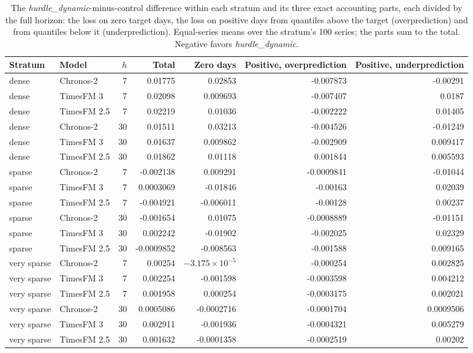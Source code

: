 \begin{table}[htbp]
\centering\footnotesize\setlength{\tabcolsep}{3.5pt}
\caption{The \emph{hurdle\_dynamic}-minus-control \qs{} difference within each stratum and its three exact
accounting parts, each divided by the full horizon: the loss on zero target days, the loss on positive days
from quantiles above the target (overprediction) and from quantiles below it (underprediction). Equal-series
means over the stratum's 100 series; the parts sum to the total. Negative favors \emph{hurdle\_dynamic}.}
\label{tab:s3parts}
\begin{tabular}{llrrrrr}
\toprule
Stratum & Model & $h$ & Total & Zero days & Positive, overprediction & Positive, underprediction \\
\midrule
dense & Chronos-2 & 7 & 0.01775 & 0.02853 & -0.007873 & -0.00291 \\
dense & TimesFM 3 & 7 & 0.02098 & 0.009693 & -0.007407 & 0.0187 \\
dense & TimesFM 2.5 & 7 & 0.02219 & 0.01036 & -0.002222 & 0.01405 \\
dense & Chronos-2 & 30 & 0.01511 & 0.03213 & -0.004526 & -0.01249 \\
dense & TimesFM 3 & 30 & 0.01637 & 0.009862 & -0.002909 & 0.009417 \\
dense & TimesFM 2.5 & 30 & 0.01862 & 0.01118 & 0.001844 & 0.005593 \\
sparse & Chronos-2 & 7 & -0.002138 & 0.009291 & -0.0009841 & -0.01044 \\
sparse & TimesFM 3 & 7 & 0.0003069 & -0.01846 & -0.00163 & 0.02039 \\
sparse & TimesFM 2.5 & 7 & -0.004921 & -0.006011 & -0.00128 & 0.00237 \\
sparse & Chronos-2 & 30 & -0.001654 & 0.01075 & -0.0008889 & -0.01151 \\
sparse & TimesFM 3 & 30 & 0.002242 & -0.01902 & -0.002025 & 0.02329 \\
sparse & TimesFM 2.5 & 30 & -0.0009852 & -0.008563 & -0.001588 & 0.009165 \\
very sparse & Chronos-2 & 7 & 0.00254 & $-3.175 \times 10^{-5}$ & -0.000254 & 0.002825 \\
very sparse & TimesFM 3 & 7 & 0.002254 & -0.001598 & -0.0003598 & 0.004212 \\
very sparse & TimesFM 2.5 & 7 & 0.001958 & 0.000254 & -0.0003175 & 0.002021 \\
very sparse & Chronos-2 & 30 & 0.0005086 & -0.0002716 & -0.0001704 & 0.0009506 \\
very sparse & TimesFM 3 & 30 & 0.002911 & -0.001936 & -0.0004321 & 0.005279 \\
very sparse & TimesFM 2.5 & 30 & 0.001632 & -0.0001358 & -0.0002519 & 0.00202 \\
\bottomrule
\end{tabular}
\end{table}

